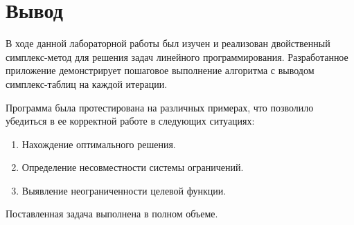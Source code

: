 \documentclass[oneside,a4paper,14pt]{extarticle}
\begin{document}
\section{Вывод}
В ходе данной лабораторной работы был изучен и реализован двойственный симплекс-метод для решения задач линейного программирования. Разработанное приложение демонстрирует пошаговое выполнение алгоритма с выводом симплекс-таблиц на каждой итерации.

Программа была протестирована на различных примерах, что позволило убедиться в ее корректной работе в следующих ситуациях:
\begin{enumerate}
    \item Нахождение оптимального решения.
    \item Определение несовместности системы ограничений.
    \item Выявление неограниченности целевой функции.
\end{enumerate}
Поставленная задача выполнена в полном объеме.
\end{document}
